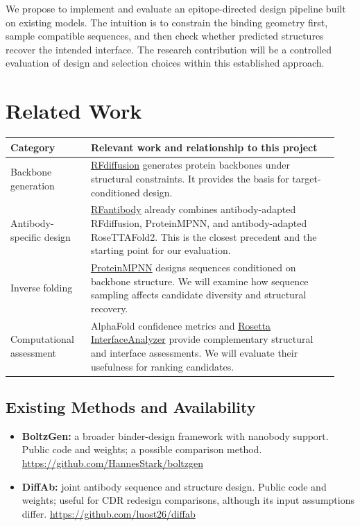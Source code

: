 \documentclass[11pt, logo, nonumbering]{preprint}
\begin{document}
We propose to implement and evaluate an epitope-directed design pipeline built on existing models. The intuition is to constrain the binding geometry first, sample compatible sequences, and then check whether predicted structures recover the intended interface. The research contribution will be a controlled evaluation of design and selection choices within this established approach.

\section{Related Work}
\label{sec:related}
\begin{center}
\small
\begin{tabular}{@{}>{\raggedright\arraybackslash}p{0.23\linewidth} >{\raggedright\arraybackslash}p{0.71\linewidth}@{}}
\toprule
\textbf{Category} & \textbf{Relevant work and relationship to this project} \\
\midrule
Backbone generation & \href{https://www.nature.com/articles/s41586-023-06415-8}{RFdiffusion} generates protein backbones under structural constraints. It provides the basis for target-conditioned design. \\
\addlinespace
Antibody-specific design & \href{https://github.com/RosettaCommons/RFantibody}{RFantibody} already combines antibody-adapted RFdiffusion, ProteinMPNN, and antibody-adapted RoseTTAFold2. This is the closest precedent and the starting point for our evaluation. \\
\addlinespace
Inverse folding & \href{https://github.com/dauparas/ProteinMPNN}{ProteinMPNN} designs sequences conditioned on backbone structure. We will examine how sequence sampling affects candidate diversity and structural recovery. \\
\addlinespace
Computational assessment & AlphaFold confidence metrics and \href{https://docs.rosettacommons.org/docs/latest/application_documentation/analysis/interface-analyzer}{Rosetta InterfaceAnalyzer} provide complementary structural and interface assessments. We will evaluate their usefulness for ranking candidates. \\
\bottomrule
\end{tabular}
\end{center}

\subsection{Existing Methods and Availability}
\begin{itemize}
    \item \textbf{BoltzGen:} a broader binder-design framework with nanobody support. Public code and weights; a possible comparison method. \url{https://github.com/HannesStark/boltzgen}
    \item \textbf{DiffAb:} joint antibody sequence and structure design. Public code and weights; useful for CDR redesign comparisons, although its input assumptions differ.
    \url{https://github.com/luost26/diffab}
\end{itemize}
\end{document}
